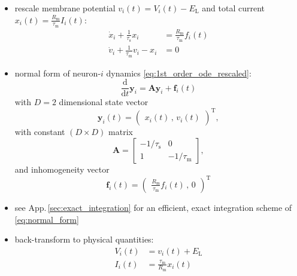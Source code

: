 \documentclass[10pt,a4paper,twoside,american]{article}
\theoremstyle{definitionstyle}
\newcommand{\diff}{\ensuremath{\text{d}}}
\newcommand{\RM}{R_\text{m}}
\newcommand{\tauM}{\tau_\text{m}}
\newcommand{\tauS}{\tau_\text{s}}
\begin{document}
\begin{appendices}
\begin{itemize}
\item rescale membrane potential $v_i(t) = V_i(t)-E_\text{L}$ and total
  current $\displaystyle{}x_{i}(t) = \frac{\RM}{\tauM}I_{i}(t)$:
  \begin{equation}
    \label{eq:1st_order_ode_rescaled}
    \begin{aligned}
      \dot{x}_{i} + \frac{1}{\tauS} x_{i} &= \frac{\RM}{\tauM} f_{i}(t)\\
      \dot{v}_{i} + \frac{1}{\tauM} v_{i} -  x_{i}  &= 0
    \end{aligned}
  \end{equation} 
\item normal form of neuron-$i$ dynamics \eqref{eq:1st_order_ode_rescaled}:
  \begin{equation}
    \label{eq:normal_form}
    \frac{\diff}{\diff t} \bm{y}_i = \bm{A} \bm{y}_i + \bm{f}_i(t)
  \end{equation}
  with $D=2$ dimensional state vector
  \begin{equation}
    \label{eq:normal_form_state_vector}    
    \bm{y}_i(t) = 
    \begin{pmatrix}
      x_{i}(t)   \,,\,
      v_{i}(t)       
    \end{pmatrix}^\text{T},
  \end{equation}
  with constant $(D\times{}D)$ matrix
  \begin{equation}
    \label{eq:normal_form_coupling_matrix}    
    \bm{A} = 
    \begin{bmatrix}
      -1/\tauS & 0\\
      1        & -1/\tauM  
    \end{bmatrix},	   
  \end{equation}
  and inhomogeneity vector
  \begin{equation}
    \label{eq:normal_form_inhomogeneity}        
    \bm{f}_i(t) = 
    \begin{pmatrix}\displaystyle
      \frac{\RM}{\tauM} f_{i}(t)     \,,\,
      0               
    \end{pmatrix}^\text{T}
  \end{equation}
  \citep[see Sec.\,3.2.2 in][]{Rotter99_381}
\item see App.\,\ref{sec:exact_integration} for an efficient, exact integration scheme of \eqref{eq:normal_form}
\item back-transform to physical quantities:
  \begin{equation}
    \begin{aligned}
      V_i(t)      & = v_i(t)+E_\text{L}\\
      I_{i}(t) & = \frac{\tauM}{\RM}x_{i}(t)
    \end{aligned}
  \end{equation}
\end{itemize}

\end{appendices}
\end{document}
